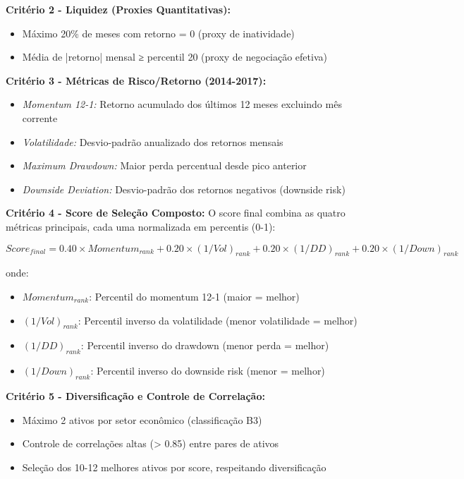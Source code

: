 \textbf{Critério 2 - Liquidez (Proxies Quantitativas):}
\begin{itemize}
    \item Máximo 20\% de meses com retorno = 0 (proxy de inatividade)
    \item Média de |retorno| mensal ≥ percentil 20 (proxy de negociação efetiva)
\end{itemize}

\textbf{Critério 3 - Métricas de Risco/Retorno (2014-2017):}
\begin{itemize}
    \item \textit{Momentum 12-1:} Retorno acumulado dos últimos 12 meses excluindo mês corrente
    \item \textit{Volatilidade:} Desvio-padrão anualizado dos retornos mensais
    \item \textit{Maximum Drawdown:} Maior perda percentual desde pico anterior
    \item \textit{Downside Deviation:} Desvio-padrão dos retornos negativos (downside risk)
\end{itemize}

\textbf{Critério 4 - Score de Seleção Composto:}
O score final combina as quatro métricas principais, cada uma normalizada em percentis (0-1):

\begin{equation}
Score_{final} = 0.40 \times Momentum_{rank} + 0.20 \times (1/Vol)_{rank} + 0.20 \times (1/DD)_{rank} + 0.20 \times (1/Down)_{rank}
\end{equation}

onde:
\begin{itemize}
    \item $Momentum_{rank}$: Percentil do momentum 12-1 (maior = melhor)
    \item $(1/Vol)_{rank}$: Percentil inverso da volatilidade (menor volatilidade = melhor)
    \item $(1/DD)_{rank}$: Percentil inverso do drawdown (menor perda = melhor)  
    \item $(1/Down)_{rank}$: Percentil inverso do downside risk (menor = melhor)
\end{itemize}

\textbf{Critério 5 - Diversificação e Controle de Correlação:}
\begin{itemize}
    \item Máximo 2 ativos por setor econômico (classificação B3)
    \item Controle de correlações altas (> 0.85) entre pares de ativos
    \item Seleção dos 10-12 melhores ativos por score, respeitando diversificação
\end{itemize}


